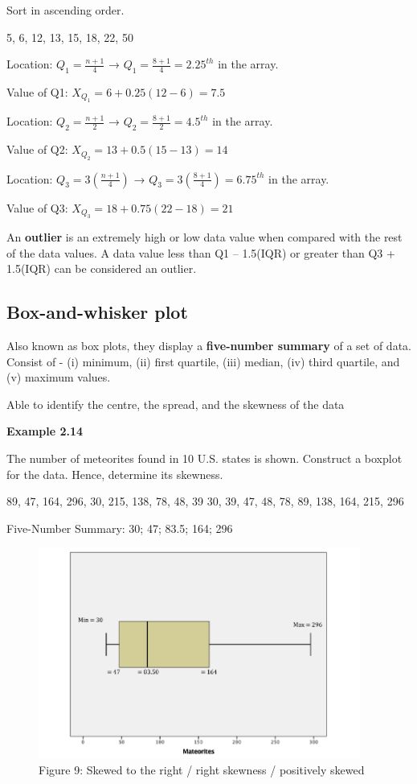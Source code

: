 \documentclass[
  a4paper,
  DIV=11,
  numbers=noendperiod,
  oneside]{scrreprt}
\begin{document}
Sort in ascending order.

5, 6, 12, 13, 15, 18, 22, 50

Location: \(Q_1 = \frac{n + 1}{4}\) →
\(Q_1 = \frac{8 + 1}{4} = 2.25^{th}\) in the array.

Value of Q1: \(X_{Q_1} = 6 + 0.25 (12 - 6) = 7.5\)

Location: \(Q_2 = \frac{n + 1}{2}\) →
\(Q_2 = \frac{8 + 1}{2} = 4.5^{th}\) in the array.

Value of Q2: \(X_{Q_2} = 13 + 0.5 (15 - 13) = 14\)

Location: \(Q_3 = 3(\frac{n + 1}{4})\) →
\(Q_3 = 3(\frac{8 + 1}{4}) = 6.75^{th}\) in the array.

Value of Q3: \(X_{Q_3} = 18 + 0.75 (22 - 18) = 21\)

An \textbf{outlier} is an extremely high or low data value when compared
with the rest of the data values. A data value less than Q1 -- 1.5(IQR)
or greater than Q3 + 1.5(IQR) can be considered an outlier.

\hypertarget{box-and-whisker-plot}{%
\subsection{Box-and-whisker plot}\label{box-and-whisker-plot}}

Also known as box plots, they display a \textbf{five-number summary} of
a set of data. Consist of - (i) minimum, (ii) first quartile, (iii)
median, (iv) third quartile, and (v) maximum values.

Able to identify the centre, the spread, and the skewness of the data

{\textbf{Example 2.14}}

The number of meteorites found in 10 U.S. states is shown. Construct a
boxplot for the data. Hence, determine its skewness.

89, 47, 164, 296, 30, 215, 138, 78, 48, 39 30, 39, 47, 48, 78, 89, 138,
164, 215, 296

Five-Number Summary: 30; 47; 83.5; 164; 296

\begin{figure}

{\centering \includegraphics[width=4.16667in,height=\textheight]{images/ch2/picture17.png}

}

\caption{Figure 9: Skewed to the right / right skewness / positively
skewed}

\end{figure}
\end{document}
